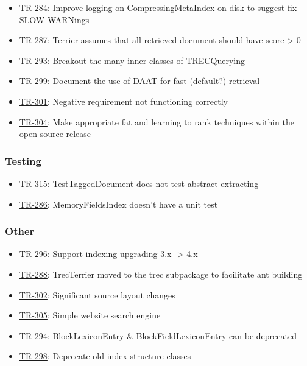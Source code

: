 \begin{itemize}
\tightlist
\item
  \href{http://terrier.org/issues/browse/TR-284}{TR-284}: Improve
  logging on CompressingMetaIndex on disk to suggest fix SLOW WARNings
\item
  \href{http://terrier.org/issues/browse/TR-287}{TR-287}: Terrier
  assumes that all retrieved document should have score \textgreater{} 0
\item
  \href{http://terrier.org/issues/browse/TR-293}{TR-293}: Breakout the
  many inner classes of TRECQuerying
\item
  \href{http://terrier.org/issues/browse/TR-299}{TR-299}: Document the
  use of DAAT for fast (default?) retrieval
\item
  \href{http://terrier.org/issues/browse/TR-301}{TR-301}: Negative
  requirement not functioning correctly
\item
  \href{http://terrier.org/issues/browse/TR-304}{TR-304}: Make
  appropriate fat and learning to rank techniques within the open source
  release
\end{itemize}

\subsubsection{Testing}\label{testing}

\begin{itemize}
\tightlist
\item
  \href{http://terrier.org/issues/browse/TR-315}{TR-315}:
  TestTaggedDocument does not test abstract extracting
\item
  \href{http://terrier.org/issues/browse/TR-286}{TR-286}:
  MemoryFieldsIndex doesn't have a unit test
\end{itemize}

\subsubsection{Other}\label{other-1}

\begin{itemize}
\tightlist
\item
  \href{http://terrier.org/issues/browse/TR-296}{TR-296}: Support
  indexing upgrading 3.x -\textgreater{} 4.x
\item
  \href{http://terrier.org/issues/browse/TR-288}{TR-288}: TrecTerrier
  moved to the trec subpackage to facilitate ant building
\item
  \href{http://terrier.org/issues/browse/TR-302}{TR-302}: Significant
  source layout changes
\item
  \href{http://terrier.org/issues/browse/TR-305}{TR-305}: Simple website
  search engine
\item
  \href{http://terrier.org/issues/browse/TR-294}{TR-294}:
  BlockLexiconEntry \& BlockFieldLexiconEntry can be deprecated
\item
  \href{http://terrier.org/issues/browse/TR-298}{TR-298}: Deprecate old
  index structure classes
\end{itemize}


